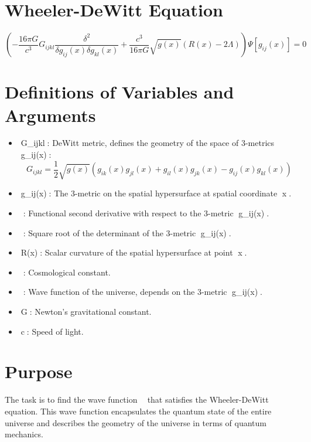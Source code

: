 \documentclass{article}
\begin{document}
\section*{Wheeler-DeWitt Equation}

\[
\left( - \frac{16 \pi G}{c^3} G_{ijkl} \frac{\delta^2}{\delta g_{ij}(x) \delta g_{kl}(x)} + \frac{c^3}{16 \pi G} \sqrt{g(x)} \left( R(x) - 2 \Lambda \right) \right) \Psi[g_{ij}(x)] = 0
\]

\section*{Definitions of Variables and Arguments}

\begin{itemize}
    \item G_{ijkl}: DeWitt metric, defines the geometry of the space of 3-metrics g_{ij}(x):
\[
    G_{ijkl} = \frac{1}{2} \sqrt{g(x)} \left( g_{ik}(x) g_{jl}(x) + g_{il}(x) g_{jk}(x) - g_{ij}(x) g_{kl}(x) \right)
\]
    
    \item g_{ij}(x): The 3-metric on the spatial hypersurface at spatial coordinate x.
    
    \item : Functional second derivative with respect to the 3-metric g_{ij}(x).
    
    \item : Square root of the determinant of the 3-metric g_{ij}(x).
    
    \item R(x): Scalar curvature of the spatial hypersurface at point x.
    
    \item \Lambda: Cosmological constant.
    
    \item \Psi[g_{ij}(x)]: Wave function of the universe, depends on the 3-metric g_{ij}(x).
    
    \item G: Newton's gravitational constant.
    
    \item c: Speed of light.
\end{itemize}

\section*{Purpose}

The task is to find the wave function \Psi[g_{ij}(x)] that satisfies the Wheeler-DeWitt equation. This wave function encapsulates the quantum state of the entire universe and describes the geometry of the universe in terms of quantum mechanics.
\end{document}
